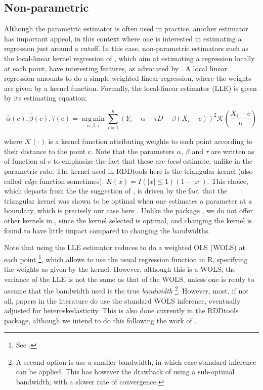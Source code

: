 \documentclass[english,nojss]{jss}\usepackage{graphicx, color}
\DeclareMathOperator*{\argmi}{arg\,min}
\newcommand{\argmin}[1]{\underset{#1}{\argmi}}
\begin{document}
\subsection{Non-parametric}

Although the parametric estimator is often used in practice, another
estimator has important appeal, in this context where one is interested
in estimating a regression just around a cutoff. In this case, non-parametric
estimators such as the local-linear kernel regression of \citet{FanGijbels1992,FanGijbels1996},
which aim at estimating a regression locally at each point, have interesting
features, as advocated by \citet{Porter2003}. A local linear regression
amounts to do a simple weighted linear regression, where the weights
are given by a kernel function. Formally, the local-linear estimator
(LLE) is given by its estimating equation:



\begin{equation}
\hat{\alpha}(c),\hat{\beta}(c),\hat{\tau}(c)=\argmin{\alpha,\beta,\tau}\sum_{i=1}^{n}\left(Y_{i}-\alpha-\tau D-\beta(X_{i}-c)\right)^{2}\mathcal{K}\left(\frac{X_{i}-c}{h}\right)\label{eq:LLEform}
\end{equation}


where $\mathcal{K}(\cdot)$ is a kernel function attributing weights
to each point according to their distance to the point c. Note that
the parameters $\alpha$, $\beta$ and $\tau$ are written as of function
of $c$ to emphasize the fact that these are \emph{local} estimate,
unlike in the parametric rate. The kernel used in RDDtools here is
the triangular kernel (also called \emph{edge} function sometimes):
$K(x)=I(|x|\leq1)(1-|x|)$. This choice, which departs from the the
suggestion of \citet{LeeLemieux2010}, is driven by the fact that
the triangular kernel was shown to be optimal when one estimates a
parameter at a boundary, which is precisely our case here \citep{ChengFanEtAl1997}.
Unlike the package , we do not offer other kernels in ,
since the kernel selected is optimal, and changing the kernel is found
to have little impact compared to changing the bandwidths.

Note that using the LLE estimator reduces to do a weighted OLS (WOLS)
at each point%
\footnote{See \citep[equ. 3.4, page  58]{FanGijbels1996}. %
}, which allows to use the usual regression function  in
R, specifying the weights as given by the kernel. However, although
this is a WOLS, the variance of the LLE is not the same as that of
the WOLS, unless one is ready to assume that the bandwidth used is
the true \emph{bandwidth}%
\footnote{A second option is use a smaller bandwidth, in which case standard
inference can be applied. This has however the drawback of using a
sub-optimal bandwidth, with a slower rate of convergence. %
}. However, most, if not all, papers in the literature do use the standard
WOLS inference, eventually adjusted for heteroskedasticity. This is
also done currently in the RDDtools package, although we intend to
do this following the work of \citet{CalonicoCattaneoEtAl2012}. 
\end{document}
